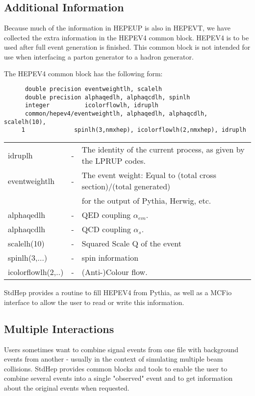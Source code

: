 \subsection { Additional Information }

Because much of the information in HEPEUP is also in HEPEVT, 
we have collected the extra information in the HEPEV4 common block.  
HEPEV4 is to be used after full event generation is finished.  
This common block is not intended for use when interfacing a parton 
generator to a hadron generator.

\noindent The HEPEV4 common block has the following form:
\begin{verbatim}
      double precision eventweightlh, scalelh
      double precision alphaqedlh, alphaqcdlh, spinlh
      integer          icolorflowlh, idruplh
      common/hepev4/eventweightlh, alphaqedlh, alphaqcdlh, scalelh(10),
     1              spinlh(3,nmxhep), icolorflowlh(2,nmxhep), idruplh
\end{verbatim}
\begin{center}
\begin{tabular}{lcl}
idruplh        &-& The identity of the current process, as given by the LPRUP codes.\\
eventweightlh  &-& The event weight: Equal to (total cross section)/(total generated)\\
               & &  for the output of Pythia, Herwig, etc. \\
alphaqedlh         &-& QED coupling $\alpha_{em}$. \\
alphaqcdlh         &-& QCD coupling $\alpha_s$. \\
scalelh(10)        &-& Squared Scale Q of the event \\
spinlh(3,...)       &-& spin information \\
icolorflowlh(2,..) &-& (Anti-)Colour flow. \\
\end{tabular}
\end{center}

StdHep provides a routine to fill HEPEV4 from Pythia, as well as a MCFio 
interface to allow the user to read or write this information.

\subsection { Multiple Interactions }

Users sometimes want to combine signal events from one file with background 
events from another - usually in the context of simulating multiple beam
collisions.  StdHep provides common blocks and tools to enable the user
to combine several events into a single "observed" event and to get
information about the original events when requested.

